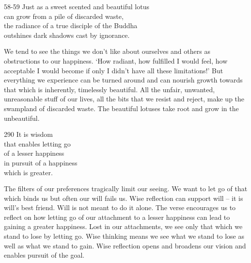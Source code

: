 
\begin{dhpVerse}{58-59}
\label{dhp-58}\label{dhp-59}
Just as a sweet scented and beautiful lotus\\
can grow from a pile of discarded waste,\\
the radiance of a true disciple of the Buddha\\
outshines dark shadows cast by ignorance.
\end{dhpVerse}

\begin{dhpRefl}

We tend to see the things we don't like about ourselves and others as
obstructions to our happiness. `How radiant, how fulfilled I would
feel, how acceptable I would become if only I didn't have all these
limitations!' But everything we experience can be turned around and
can nourish growth towards that which is inherently, timelessly
beautiful. All the unfair, unwanted, unreasonable stuff of our lives,
all the bits that we resist and reject, make up the swampland of
discarded waste. The beautiful lotuses take root and grow in the
unbeautiful.

\end{dhpRefl}


\begin{dhpVerse}{290}
\label{dhp-290}
It is wisdom\\
that enables letting go\\
of a lesser happiness\\
in pursuit of a happiness\\
which is greater.
\end{dhpVerse}

\begin{dhpRefl}

The filters of our preferences tragically limit our seeing. We want
to let go of that which binds us but often our will fails us. Wise
reflection can support will -- it is will's best friend. Will is not
meant to do it alone. The verse encourages us to reflect on how
letting go of our attachment to a lesser happiness can lead to
gaining a greater happiness. Lost in our attachments, we see only
that which we stand to lose by letting go. Wise thinking means we see
what we stand to lose as well as what we stand to gain. Wise
reflection opens and broadens our vision and enables pursuit of the
goal.

\end{dhpRefl}

